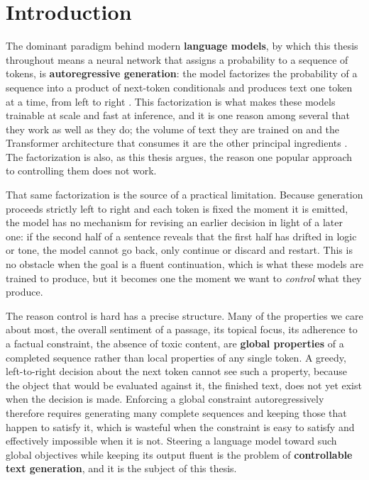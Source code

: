 \section{Introduction}
\label{ch:introduction}

The dominant paradigm behind modern \textbf{language models}, by which this thesis throughout means a neural network that assigns a probability to a sequence of tokens, is \textbf{autoregressive generation}: the model factorizes the probability of a sequence into a product of next-token conditionals and produces text one token at a time, from left to right \citep{radford2019language, brown2020language}. This factorization is what makes these models trainable at scale and fast at inference, and it is one reason among several that they work as well as they do; the volume of text they are trained on and the Transformer architecture that consumes it are the other principal ingredients \citep{vaswani2017attention, brown2020language}. The factorization is also, as this thesis argues, the reason one popular approach to controlling them does not work.

That same factorization is the source of a practical limitation. Because generation proceeds strictly left to right and each token is fixed the moment it is emitted, the model has no mechanism for revising an earlier decision in light of a later one: if the second half of a sentence reveals that the first half has drifted in logic or tone, the model cannot go back, only continue or discard and restart. This is no obstacle when the goal is a fluent continuation, which is what these models are trained to produce, but it becomes one the moment we want to \emph{control} what they produce.

The reason control is hard has a precise structure. Many of the properties we care about most, the overall sentiment of a passage, its topical focus, its adherence to a factual constraint, the absence of toxic content, are \textbf{global properties} of a completed sequence rather than local properties of any single token. A greedy, left-to-right decision about the next token cannot see such a property, because the object that would be evaluated against it, the finished text, does not yet exist when the decision is made. Enforcing a global constraint autoregressively therefore requires generating many complete sequences and keeping those that happen to satisfy it, which is wasteful when the constraint is easy to satisfy and effectively impossible when it is not. Steering a language model toward such global objectives while keeping its output fluent is the problem of \textbf{controllable text generation}, and it is the subject of this thesis.

